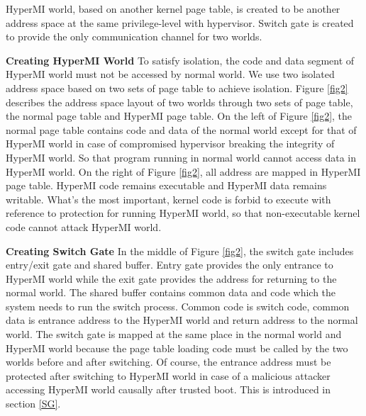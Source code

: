 \documentclass[conference]{IEEEtran}
\begin{document}
HyperMI world, based on another kernel page table, is created to be another address space at the same privilege-level with hypervisor. %
Switch gate is created to provide the only communication channel for two worlds.


\textbf{Creating HyperMI World}
To satisfy isolation, the code and data segment of HyperMI world must not be accessed by normal world. We use two isolated address space based on two sets of page table to achieve isolation.
Figure \ref{fig2} describes the address space layout of two worlds through two sets of page table, the normal page table and HyperMI page table. On the left of Figure \ref{fig2}, the normal page table contains code and data of the normal world except for that of HyperMI world in case of compromised hypervisor breaking the integrity of HyperMI world. So that program running in normal world cannot access data in HyperMI world. On the right of Figure \ref{fig2}, all address are mapped in HyperMI page table.
HyperMI code remains executable and HyperMI data remains writable. What's the most important, kernel code is forbid to execute with reference to protection for running HyperMI world, so that non-executable kernel code  cannot attack HyperMI world.

\textbf{Creating Switch Gate}
In the middle of Figure \ref{fig2}, the switch gate includes entry/exit gate and shared buffer. Entry gate provides the only entrance to HyperMI world while the exit gate provides the address for returning to the normal world. The shared buffer contains common data and code which the system needs to run the switch process. Common code is switch code, common data is entrance address to the HyperMI world and return address to the normal world. The switch gate is mapped at the same place in the normal world and HyperMI world because the page table loading code must be called by the two worlds before and after switching. Of course, the entrance address must be protected after switching to HyperMI world in case of a malicious attacker accessing HyperMI world causally after trusted boot. This is introduced in section \ref{SG}.
\end{document}
